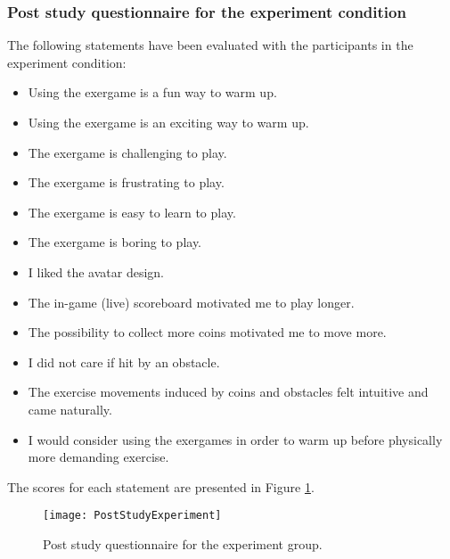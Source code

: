 \subsubsection{Post study questionnaire for the experiment condition} 
The following statements have been evaluated with the participants in the experiment condition:
\begin{itemize}
 \item Using the exergame is a fun way to warm up.
 \item  Using the exergame is an exciting way to warm up.
 \item  The exergame is challenging to play.
 \item  The exergame is frustrating to play.
 \item  The exergame is easy to learn to play.
  \item The exergame is boring to play.
  \item I liked the avatar design.
  \item The in-game (live) scoreboard motivated me to play longer.
  \item The possibility to collect more coins motivated me to move more.
 \item  I did not care if hit by an obstacle. 
 \item  The exercise movements induced by coins and obstacles felt intuitive and came naturally. 
 \item I would consider using the exergames in order to warm up before physically more demanding exercise.
\end{itemize}
The scores for each statement are presented in Figure \ref{fig:poststudyexperiment}.\\
\begin{figure}[h]
    \centering
    \texttt{[image: PostStudyExperiment]}
    \caption{Post study questionnaire for the experiment group.}
    \label{fig:poststudyexperiment}
\end{figure}\\
